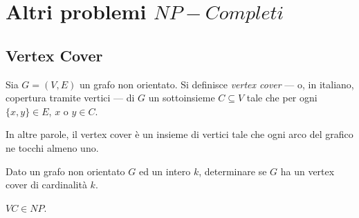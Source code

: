 \section{Altri problemi $NP-Completi$}

\subsection{Vertex Cover}

Sia $G = (V, E)$ un grafo non orientato. Si definisce \textit{vertex cover} --- o, in italiano, copertura tramite vertici --- di $G$ un sottoinsieme $C \subseteq V$ tale che per ogni $\{x, y\} \in E$, $x \text{ o } y \in C$.

In altre parole, il vertex cover è un insieme di vertici tale che ogni arco del grafico ne tocchi almeno uno.

\vspace{0.25cm}

\begin{defn}
    Dato un grafo non orientato $G$ ed un intero $k$, determinare se $G$ ha un vertex cover di cardinalità $k$.
\end{defn}

\vspace{0.25cm}

\begin{lemm}
	$VC \in NP$.
\end{lemm}

